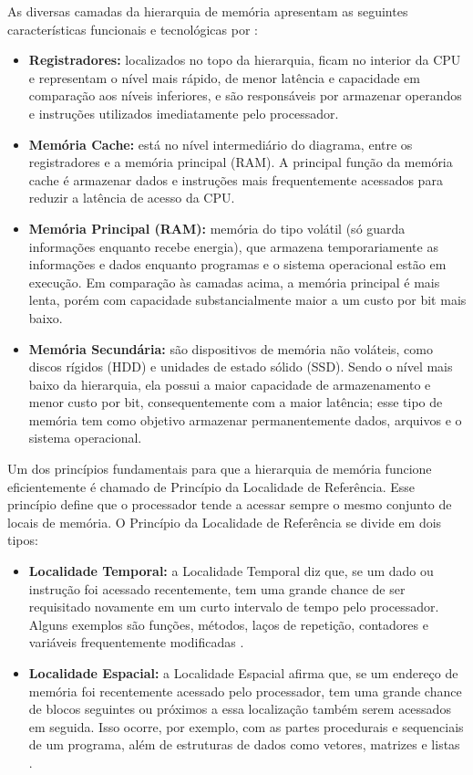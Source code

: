 \documentclass[portuguese]{sbcreviews-2025}%
\begin{document}
As diversas camadas da hierarquia de memória apresentam as seguintes características funcionais e tecnológicas por \citep{maues2025}:

\begin{itemize}
    \item \textbf{Registradores:} localizados no topo da hierarquia, ficam no interior da CPU e representam o nível mais rápido, de menor latência e capacidade em comparação aos níveis inferiores, 
    e são responsáveis por armazenar operandos e instruções utilizados imediatamente pelo processador.
    \item \textbf{Memória Cache:} está no nível intermediário do diagrama, entre os registradores e a memória principal (RAM). A principal função da memória cache é armazenar dados e instruções mais frequentemente acessados para reduzir a 
    latência de acesso da CPU.
    \item \textbf{Memória Principal (RAM):} memória do tipo volátil (só guarda informações enquanto recebe energia), que armazena temporariamente as informações e dados enquanto programas e o sistema operacional estão em execução. 
    Em comparação às camadas acima, a memória principal é mais lenta, porém com capacidade substancialmente maior a um custo por bit mais baixo.
    \item \textbf{Memória Secundária:} são dispositivos de memória não voláteis, como discos rígidos (HDD) e unidades de estado sólido (SSD). Sendo o nível mais baixo da hierarquia, ela possui a maior 
    capacidade de armazenamento e menor custo por bit, consequentemente com a maior latência; esse tipo de memória tem como objetivo armazenar permanentemente dados, arquivos e o sistema operacional.
\end{itemize}

Um dos princípios fundamentais para que a hierarquia de memória funcione eficientemente é chamado de Princípio da Localidade de Referência. Esse princípio define que o processador tende a acessar 
sempre o mesmo conjunto de locais de memória. O Princípio da Localidade de Referência se divide em dois tipos:

\begin{itemize}
    \item \textbf{Localidade Temporal:} a Localidade Temporal diz que, se um dado ou instrução foi acessado recentemente, tem uma grande chance de ser requisitado novamente em um curto intervalo de 
    tempo pelo processador. Alguns exemplos são funções, métodos, laços de repetição, contadores e variáveis frequentemente modificadas \citep{ferreira2015}.
    \item \textbf{Localidade Espacial:} a Localidade Espacial afirma que, se um endereço de memória foi recentemente acessado pelo processador, tem uma grande chance de blocos seguintes ou próximos 
    a essa localização também serem acessados em seguida. Isso ocorre, por exemplo, com as partes procedurais e sequenciais de um programa, além de estruturas de dados como vetores, matrizes e listas \citep{ferreira2015}.
\end{itemize}
\end{document}
